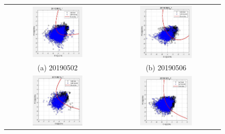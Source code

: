 \begin{figure}
\begin{tabular}{cc}

    \includegraphics[width=0.5\textwidth]{Figure/20190502_C.JPG} &   \includegraphics[width=0.5\textwidth]{Figure/20190506_C.JPG} \\
    (a) 20190502 & (b) 20190506 \\
    \includegraphics[width=0.5\textwidth]{Figure/20190513_C.JPG} &   \includegraphics[width=0.5\textwidth]{Figure/20190521_C.JPG} \\

\end{tabular}
\end{figure}
